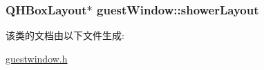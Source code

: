 \subsubsection[{\texorpdfstring{shower\+Layout}{showerLayout}}]{\setlength{\rightskip}{0pt plus 5cm}Q\+H\+Box\+Layout$\ast$ guest\+Window\+::shower\+Layout\hspace{0.3cm}{\ttfamily [private]}}\hypertarget{classguest_window_aade794092a2f687a85c180b445260351_aade794092a2f687a85c180b445260351}{}\label{classguest_window_aade794092a2f687a85c180b445260351_aade794092a2f687a85c180b445260351}


该类的文档由以下文件生成\+:\begin{DoxyCompactItemize}
\item 
\hyperlink{guestwindow_8h}{guestwindow.\+h}\end{DoxyCompactItemize}
